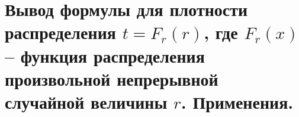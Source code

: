 \documentclass[polytech/stats/exam-2023/stats-exam-2023.tex]{subfiles}
\begin{document}
\section{Вывод формулы для плотности распределения $t=F_r(r)$, где $F_r(x)$ – функция распределения произвольной непрерывной случайной величины $r$. Применения.}
\end{document}
